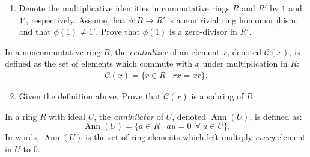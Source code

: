 \begin{enumerate}
    \setlength{\itemsep}{10pt} %
    \item Denote the multiplicative identities in commutative rings $R$ and $R'$ by $1$ and $1'$, respectively. Assume that $\phi: R \to R'$ is a nontrivial ring homomorphism, and that $\phi(1) \neq 1'$. Prove that $\phi(1)$ is a zero-divisor in $R'$. \\ \steezybreak

\end{enumerate}
\begin{definition}[Centralizer]
    In a noncommutative ring $R$, the \emph{centralizer} of an element $x$, denoted $\mathcal{C}(x)$, is defined as the set of elements which commute with $x$ under multiplication in $R$:
\begin{align*}
    \mathcal{C}(x) = \{ r \in R \mid rx = xr \}.
\end{align*}
\end{definition}
\begin{enumerate}
    \setcounter{enumi}{1}
    
    \item Given the definition above, Prove that $\mathcal{C}(x)$ is a subring of $R$. \\ \steezybreak
\end{enumerate}

\begin{definition}[Annihilator]
    In a ring $R$ with ideal $U$, the \emph{annihilator} of $U$, denoted $\operatorname{Ann}(U)$, is defined as:
\[
\operatorname{Ann}(U) = \{ a \in R \mid au = 0 \ \ \forall \ u \in U \}.
\]
In words, $\operatorname{Ann}(U)$ is the set of ring elements which left-multiply \textit{every} element in $U$ to $0$. 
\end{definition}


